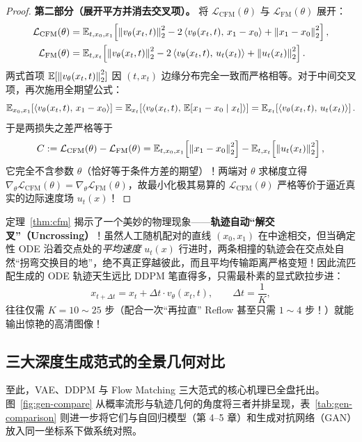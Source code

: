 \begin{thmBox}
\begin{proof}
\textbf{第二部分（展开平方并消去交叉项）。} 将 $\mathcal{L}_{\mathrm{CFM}}(\theta)$ 与 $\mathcal{L}_{\mathrm{FM}}(\theta)$ 展开：
\begin{align*}
  \mathcal{L}_{\mathrm{CFM}}(\theta)
  &= \mathbb{E}_{t, x_0, x_1}\!\left[\left\|v_\theta(x_t, t)\right\|_2^2 - 2\left\langle v_\theta(x_t, t),\, x_1 - x_0 \right\rangle + \left\|x_1 - x_0\right\|_2^2\right], \\
  \mathcal{L}_{\mathrm{FM}}(\theta)
  &= \mathbb{E}_{t, x_t}\!\left[\left\|v_\theta(x_t, t)\right\|_2^2 - 2\left\langle v_\theta(x_t, t),\, u_t(x_t) \right\rangle + \left\|u_t(x_t)\right\|_2^2\right].
\end{align*}
两式首项 $\mathbb{E}[\left\|v_\theta(x_t, t)\right\|_2^2]$ 因 $(t, x_t)$ 边缘分布完全一致而严格相等。对于中间交叉项，再次施用全期望公式：
\[
  \mathbb{E}_{x_0, x_1}\!\left[\left\langle v_\theta(x_t, t),\, x_1 - x_0 \right\rangle\right]
  = \mathbb{E}_{x_t}\!\left[\left\langle v_\theta(x_t, t),\, \mathbb{E}\!\left[x_1 - x_0 \mid x_t\right] \right\rangle\right]
  = \mathbb{E}_{x_t}\!\left[\left\langle v_\theta(x_t, t),\, u_t(x_t) \right\rangle\right].
\]
于是两损失之差严格等于
\[
  C := \mathcal{L}_{\mathrm{CFM}}(\theta) - \mathcal{L}_{\mathrm{FM}}(\theta)
  = \mathbb{E}_{t, x_0, x_1}\!\left[\left\|x_1 - x_0\right\|_2^2\right] - \mathbb{E}_{t, x_t}\!\left[\left\|u_t(x_t)\right\|_2^2\right],
\]
它完全不含参数 $\theta$（恰好等于条件方差的期望）！两端对 $\theta$ 求梯度立得 $\nabla_\theta \mathcal{L}_{\mathrm{CFM}}(\theta) = \nabla_\theta \mathcal{L}_{\mathrm{FM}}(\theta)$，故最小化极其易算的 $\mathcal{L}_{\mathrm{CFM}}(\theta)$ 严格等价于逼近真实的边际速度场 $u_t(x)$！
\end{proof}
\end{thmBox}

定理~\ref{thm:cfm} 揭示了一个美妙的物理现象——\textbf{轨迹自动“解交叉”（Uncrossing）}！虽然人工随机配对的直线 $(x_0, x_1)$ 在中途相交，但当确定性 ODE 沿着交点处的\emph{平均速度} $u_t(x)$ 行进时，两条相撞的轨迹会在交点处自然“拐弯交换目的地”，绝不真正穿越彼此，而且平均传输距离严格变短！因此流匹配生成的 ODE 轨迹天生远比 DDPM 笔直得多，只需最朴素的显式欧拉步进：
\[
  x_{t + \Delta t} = x_t + \Delta t \cdot v_\theta(x_t, t), \qquad \Delta t = \frac{1}{K},
\]
往往仅需 $K = 10 \sim 25$ 步（配合一次“再拉直” Reflow 甚至只需 $1 \sim 4$ 步！）就能输出惊艳的高清图像！

\subsection{三大深度生成范式的全景几何对比}

至此，VAE、DDPM 与 Flow Matching 三大范式的核心机理已全盘托出。图~\ref{fig:gen-compare} 从概率流形与轨迹几何的角度将三者并排呈现，表~\ref{tab:gen-comparison} 则进一步将它们与自回归模型（第 4--5 章）和生成对抗网络（GAN）放入同一坐标系下做系统对照。

